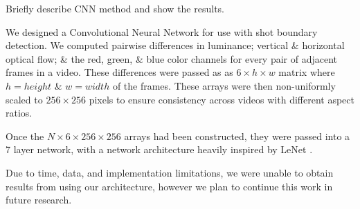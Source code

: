 Briefly describe CNN method and show the results.

We designed a Convolutional Neural Network for use with shot boundary detection. We computed pairwise differences in luminance; vertical \& horizontal optical flow; \& the red, green, \& blue color channels for every pair of adjacent frames in a video. These differences were passed as as $6 \times h \times w$ matrix where $h = height$ \& $w = width$ of the frames. These arrays were then non-uniformly scaled to $256 \times 256$ pixels to ensure consistency across videos with different aspect ratios. 

Once the $N \times 6 \times 256 \times 256$ arrays had been constructed, they were passed into a 7 layer network, with a network architecture heavily inspired by LeNet \cite{lecun1998gradient}.

Due to time, data, and implementation limitations, we were unable to obtain results from using our architecture, however we plan to continue this work in future research. 


